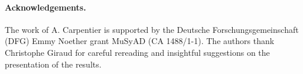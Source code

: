 \documentclass[twoside,11pt]{article}
\newcommand{\<}{\langle}
\renewcommand{\>}{\rangle}
\begin{document}
\begin{comment}


The Gaussian model that we consider is interesting from a theoretical perspective and as a first step, but other related models are more relevant when it comes to applications. A very related model that is particularly relevant in applications is the linear regression model. Some ideas and techniques for our model can definitely be re-used for treating the problem of sparsity testing (or estimation) in the linear regression model, in particular if the design is Gaussian and i.i.d.. While there are strong links between these two models, it is not at all trivial to derive bounds in all regimes of the linear regression model, based on the results of this paper, as the information theoretical nature of the problem changes a lot between these two problems in particular when the sparsity of the parameter becomes larger than the square root of the number of observations. More precisely, consider the linear regression model in dimension $n$ and with $m$ observations
$$,$$
where $\theta \in \mathbb R^n$, $\epsilon_i \sim \mathcal N(0,\sigma^2)$ for all $i \leq m$ and $X_{i,j} \sim \mathcal N(0,1)$ for all $i \leq m$ and $j \leq n$. The signal detection minimax-optimal $l_2$ separation rate over $\mathbb B_0[k]$ is (when $\sigma$ is known), as proven in~\cite{2010_EJS_Ingster}, of order

While the term $\sqrt{\frac{\Delta \log(1+n^{1/2}/\Delta)}{m}} \land \frac{n^{1/4}}{\sqrt{m}}$ clearly mirrors the signal detection minimax-optimal $l_2$ separation rate in our Gaussian model, and equivalent to the $m^{-1/4}$ part of the rate does not exist in the Gaussian model. Hence it is clear that as soon as $k \gg \sqrt{m}$, there is a conceptual divergence between the Gaussian model and the linear regression model even in the case of the simplest testing problem we consider in this paper, ie.\ ~signal detection. Understanding what happens for linear regression, in particular in the case where $k \gg \sqrt{m}$, is therefore an interesting and challenging problem, in perspective of what we have done in this paper. Moreover, understanding in the linear model what happens when the noise variance is not known, and when the design is not i.i.d.~Gaussian, opens interesting perspective.


\end{comment}




\paragraph{Acknowledgements.} The work of A. Carpentier is supported by the Deutsche Forschungsgemeinschaft (DFG) Emmy Noether grant MuSyAD (CA 1488/1-1). The authors thank Christophe Giraud for careful rereading and insightful suggestions on the presentation of the results.
\end{document}
